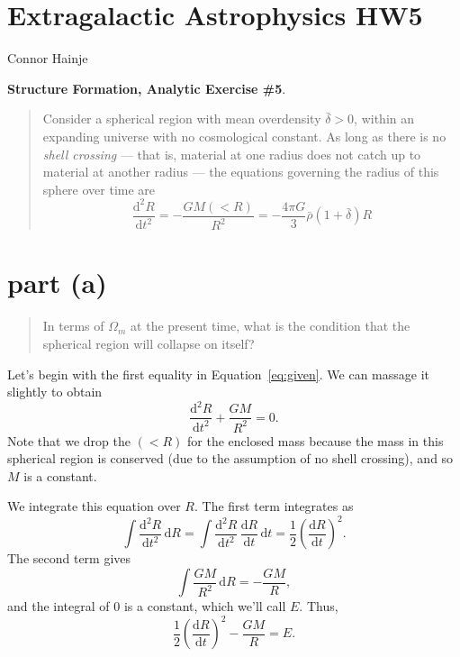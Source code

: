 \documentclass{article}
\renewcommand{\d}{\mathrm{d}}
\begin{document}
{
	\centering
	\section*{Extragalactic Astrophysics HW5}
	Connor Hainje
	\vspace{2em}
	\par
}

\textbf{Structure Formation, Analytic Exercise \#5}.

\begin{quote}
	Consider a spherical region with mean overdensity $\bar\delta > 0$,
	within an expanding universe with no cosmological constant. As long as
	there is no \textit{shell crossing} --- that is, material at one radius
	does not catch up to material at another radius --- the equations
	governing the radius of this sphere over time are
	\begin{equation}
		\label{eq:given}
		\frac{\d^2 R}{\d t^2}
		= - \frac{G M(<R)}{R^2}
		= - \frac{4 \pi G}{3} \bar\rho \left(1 + \bar\delta\right) R
	\end{equation}
\end{quote}

\section*{part (a)}

\begin{quote}
	In terms of $\Omega_m$ at the present time, what is the condition that
	the spherical region will collapse on itself?
\end{quote}

Let's begin with the first equality in Equation~\ref{eq:given}. We can massage
it slightly to obtain
\begin{equation}
	\frac{\d^2 R}{\d t^2} + \frac{G M}{R^2} = 0.
\end{equation}
Note that we drop the $(<R)$ for the enclosed mass because the mass in this
spherical region is conserved (due to the assumption of no shell crossing), and
so $M$ is a constant.

We integrate this equation over $R$. The first term integrates as
\begin{equation}
	\int \frac{\d^2 R}{\d t^2} \,\d R
	= 
	\int \frac{\d^2 R}{\d t^2} \, \frac{\d R}{\d t} \,\d t
	=
	\frac{1}{2} \left( \frac{\d R}{\d t} \right)^2.
\end{equation}
The second term gives
\begin{equation}
	\int \frac{G M}{R^2} \,\d R
	=
	-\frac{G M}{R},
\end{equation}
and the integral of $0$ is a constant, which we'll call $E$. Thus,
\begin{equation}
	\frac{1}{2} \left( \frac{\d R}{\d t} \right)^2
	-\frac{G M}{R}
	= E.
\end{equation}
\end{document}
